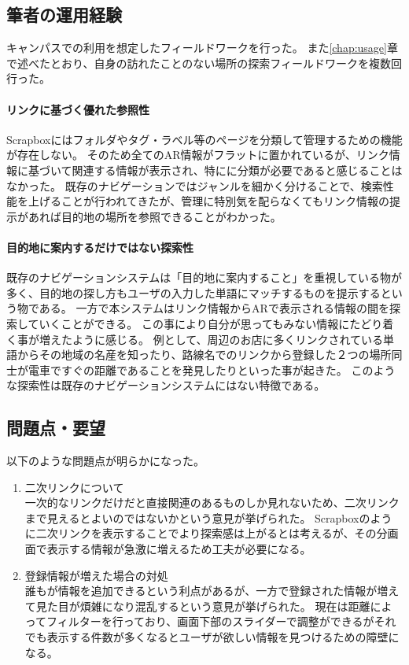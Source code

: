 \subsection{筆者の運用経験}
キャンパスでの利用を想定したフィールドワークを行った。
また\ref{chap:usage}章で述べたとおり、自身の訪れたことのない場所の探索フィールドワークを複数回行った。

\paragraph*{リンクに基づく優れた参照性}
Scrapboxにはフォルダやタグ・ラベル等のページを分類して管理するための機能が存在しない。
そのため全てのAR情報がフラットに置かれているが、リンク情報に基づいて関連する情報が表示され、特にに分類が必要であると感じることはなかった。
既存のナビゲーションではジャンルを細かく分けることで、検索性能を上げることが行われてきたが、管理に特別気を配らなくてもリンク情報の提示があれば目的地の場所を参照できることがわかった。

\paragraph*{目的地に案内するだけではない探索性}
既存のナビゲーションシステムは「目的地に案内すること」を重視している物が多く、目的地の探し方もユーザの入力した単語にマッチするものを提示するという物である。
一方で本システムはリンク情報からARで表示される情報の間を探索していくことができる。
この事により自分が思ってもみない情報にたどり着く事が増えたように感じる。
例として、周辺のお店に多くリンクされている単語からその地域の名産を知ったり、路線名でのリンクから登録した２つの場所同士が電車ですぐの距離であることを発見したりといった事が起きた。
このような探索性は既存のナビゲーションシステムにはない特徴である。


\subsection{問題点・要望}
以下のような問題点が明らかになった。
\begin{enumerate}
  \item 二次リンクについて\\
  一次的なリンクだけだと直接関連のあるものしか見れないため、二次リンクまで見えるとよいのではないかという意見が挙げられた。
  Scrapboxのように二次リンクを表示することでより探索感は上がるとは考えるが、その分画面で表示する情報が急激に増えるため工夫が必要になる。
  \item 登録情報が増えた場合の対処\\
  誰もが情報を追加できるという利点があるが、一方で登録された情報が増えて見た目が煩雑になり混乱するという意見が挙げられた。
  現在は距離によってフィルターを行っており、画面下部のスライダーで調整ができるがそれでも表示する件数が多くなるとユーザが欲しい情報を見つけるための障壁になる。
\end{enumerate}


